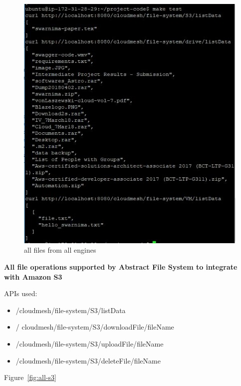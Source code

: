 \begin{figure}[!ht]
        \centering\includegraphics[width=\columnwidth]
        {image/make-test.JPG}
        \caption{all files from all engines}\label{fig:make-test}
\end{figure}


\textbf{All file operations supported by Abstract File System to integrate 
with Amazon S3}

APIs used:

\begin{itemize}
    \item /cloudmesh/file-system/S3/listData
    \item / cloudmesh/file-system/S3/downloadFile/{fileName}
    \item /cloudmesh/file-system/S3/uploadFile/{fileName}
    \item /cloudmesh/file-system/S3/deleteFile/{fileName}
\end{itemize}

Figure~\ref{fig:all-s3}

